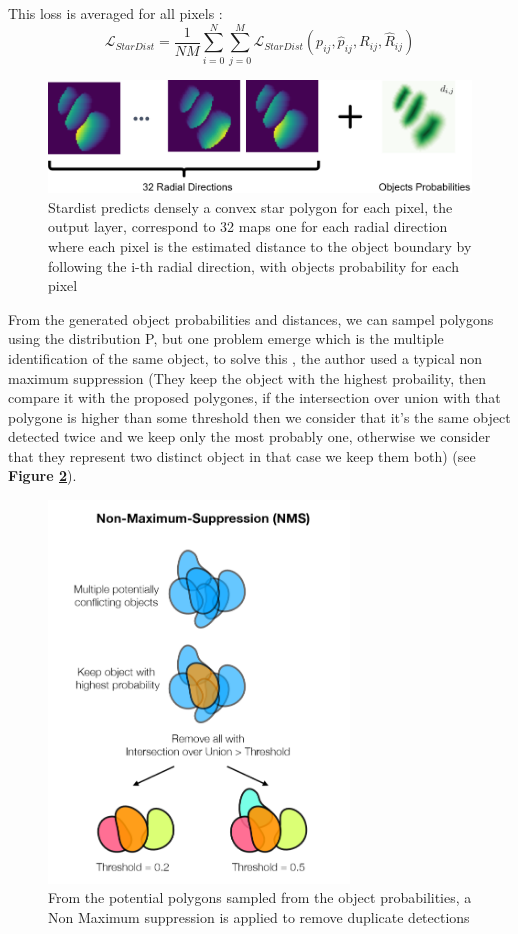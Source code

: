 \documentclass[main.tex]{subfiles}
\begin{document}
This loss is averaged for all pixels :
\begin{equation}
    \mathcal{L}_{\mathit{StarDist}} = \frac{1}{NM}\sum_{i=0}^{N}\sum_{j=0}^{M}\mathcal{L}_{\mathit{StarDist}}(p_{ij}, \hat{p}_{ij}, R_{ij}, \hat{R}_{ij})
\end{equation}

\begin{figure}[H]
    \centering
    \includegraphics[width=16cm]{images/StardistPredictions.png}
    \caption{Stardist predicts densely a convex star polygon for each pixel, the output layer, correspond to 32 maps one for each radial direction where each pixel is the estimated distance to the object boundary by following the i-th radial direction, with objects probability for each pixel}
    \label{fig:stardistOutput}
\end{figure}

From the generated object probabilities and distances, we can sampel polygons using the distribution P, but one problem emerge which is the multiple identification of the same object, to solve this , the author used a typical non maximum suppression (They keep the object with the highest probaility, then compare it with the proposed polygones, if the intersection over union with that polygone is higher than some threshold then we consider that it's the same object detected twice and we keep only the most probably one, otherwise we consider that they represent two distinct object in that case we keep them both) (see \textbf{Figure \ref{fig:nms}}). 

\begin{figure}[H]
    \centering
    \includegraphics[width=8cm]{images/nms.png}
    \caption{From the potential polygons sampled from the object probabilities, a Non Maximum suppression is applied to remove duplicate detections}
    \label{fig:nms}
\end{figure}
\end{document}
